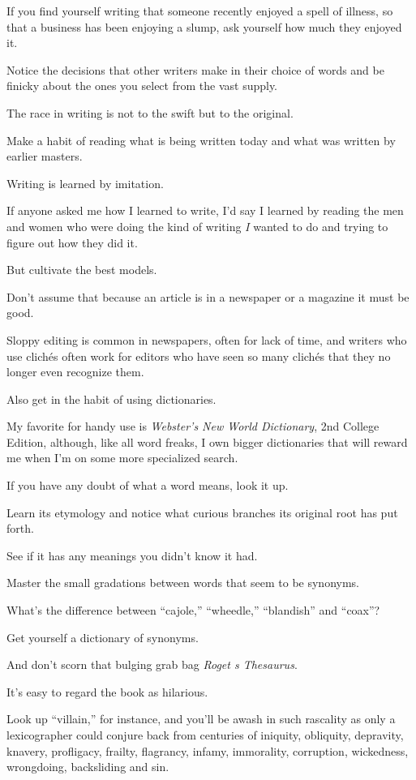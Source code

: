 \documentclass{book}
\numberwithin{equation}{section}
\begin{document}
If you find yourself writing that someone recently enjoyed a spell of illness, so that a business has been enjoying a slump, ask yourself how much they enjoyed it.

Notice the decisions that other writers make in their choice of words and be finicky about the ones you select from the vast supply.

The race in writing is not to the swift but to the original.

%
Make a habit of reading what is being written today and what was written by earlier masters.

Writing is learned by imitation.

If anyone asked me how I learned to write, I'd say I learned by reading the men and women who were doing the kind of writing \textit{I} wanted to do and trying to figure out how they did it.

But cultivate the best models.

Don't assume that because an article is in a newspaper or a magazine it must be good.

Sloppy editing is common in newspapers, often for lack of time, and writers who use clich\'es often work for editors who have seen so many clich\'es that they no longer even recognize them.

%
Also get in the habit of using dictionaries.

My favorite for handy use is \textit{Webster's New World Dictionary}, 2nd College Edition, although, like all word freaks, I own bigger dictionaries that will reward me when I'm on some more specialized search.

If you have any doubt of what a word means, look it up.

Learn its etymology and notice what curious branches its original root has put forth.

See if it has any meanings you didn't know it had.

Master the small gradations between words that seem to be synonyms.

What's the difference between ``cajole,'' ``wheedle,'' ``blandish'' and ``coax''?

Get yourself a dictionary of synonyms.

%
And don't scorn that bulging grab bag \textit{Roget
s Thesaurus}.

It's easy to regard the book as hilarious.

Look up ``villain,'' for instance, and you'll be awash in such rascality as only a lexicographer could conjure back from centuries of iniquity, obliquity, depravity, knavery, profligacy, frailty, flagrancy, infamy, immorality, corruption, wickedness, wrongdoing, backsliding and sin.
\end{document}
